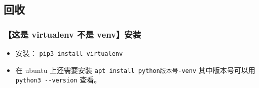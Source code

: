 \subsection{回收}

\subsubsection{【这是 virtualenv 不是 venv】安装}
\begin{itemize}
\item 安装： \verb`pip3 install virtualenv`
\item 在 ubuntu 上还需要安装 \verb`apt install python版本号-venv` 其中版本号可以用 \verb`python3 --version` 查看。
\end{itemize}
